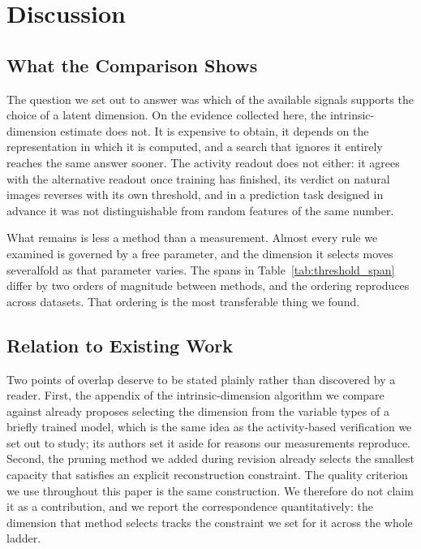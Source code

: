 \documentclass[make,article,submit,pdftex,moreauthors]{Definitions/mdpi}
\begin{document}
\section{Discussion}\label{sec:discussion}

\subsection{What the Comparison Shows}\label{sec:disc_main}

The question we set out to answer was which of the available signals
supports the choice of a latent dimension. On the evidence collected here,
the intrinsic-dimension estimate does not. It is expensive to obtain,
it depends on the representation in which it is computed, and a search
that ignores it entirely reaches the same answer sooner. The activity
readout does not either: it agrees with the alternative readout once
training has finished, its verdict on natural images reverses with its own
threshold, and in a prediction task designed in advance it was not
distinguishable from random features of the same number.

What remains is less a method than a measurement. Almost every rule we
examined is governed by a free parameter, and the dimension it selects
moves severalfold as that parameter varies. The spans in
Table~\ref{tab:threshold_span} differ by two orders of magnitude between
methods, and the ordering reproduces across datasets. That ordering is the
most transferable thing we found.

\subsection{Relation to Existing Work}\label{sec:disc_related}

Two points of overlap deserve to be stated plainly rather than discovered
by a reader. First, the appendix of the intrinsic-dimension algorithm we
compare against already proposes selecting the dimension from the
variable types of a briefly trained model, which is the same idea as the
activity-based verification we set out to study; its authors set it aside
for reasons our measurements reproduce. Second, the pruning method we
added during revision already selects the smallest capacity that satisfies
an explicit reconstruction constraint. The quality criterion we use
throughout this paper is the same construction. We therefore do not claim
it as a contribution, and we report the correspondence quantitatively: the
dimension that method selects tracks the constraint we set for it across
the whole ladder.
\end{document}

